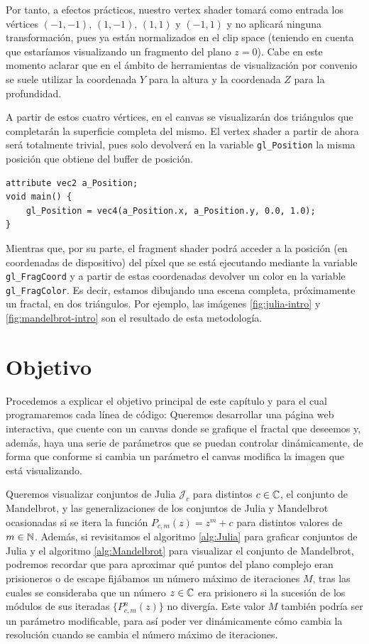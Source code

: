 Por tanto, a efectos prácticos, nuestro vertex shader tomará como entrada los vértices $(-1,-1)$, $(1,-1)$, $(1,1)$ y $(-1,1)$ y no aplicará ninguna transformación, pues ya están normalizados en el clip space (teniendo en cuenta que estaríamos visualizando un fragmento del plano $z=0$). Cabe en este momento aclarar que en el ámbito de herramientas de visualización por convenio se suele utilizar la coordenada $Y$ para la altura y la coordenada $Z$ para la profundidad. 

A partir de estos cuatro vértices, en el canvas se visualizarán dos triángulos que completarán la superficie completa del mismo. El vertex shader a partir de ahora será totalmente trivial, pues solo devolverá en la variable \verb|gl_Position| la misma posición que obtiene del buffer de posición.

\begin{lstlisting}
attribute vec2 a_Position;
void main() {
    gl_Position = vec4(a_Position.x, a_Position.y, 0.0, 1.0);
}
\end{lstlisting}

Mientras que, por su parte, el fragment shader podrá acceder a la posición (en coordenadas de dispositivo) del píxel que se está ejecutando mediante la variable \verb|gl_FragCoord| y a partir de estas coordenadas devolver un color en la variable \verb|gl_FragColor|. Es decir, estamos dibujando una escena completa, próximamente un fractal, en dos triángulos. Por ejemplo, las imágenes \ref{fig:julia-intro} y \ref{fig:mandelbrot-intro} son el resultado de esta metodología. 

\section{Objetivo}

Procedemos a explicar el objetivo principal de este capítulo y para el cual programaremos cada línea de código: Queremos desarrollar una página web interactiva, que cuente con un canvas donde se grafique el fractal que deseemos y, además, haya una serie de parámetros que se puedan controlar dinámicamente, de forma que conforme si cambia un parámetro el canvas modifica la imagen que está visualizando.

Queremos visualizar conjuntos de Julia $\mathcal{J}_c$ para distintos $c\in\mathbb{C}$, el conjunto de Mandelbrot, y las generalizaciones de los conjuntos de Julia y Mandelbrot ocasionadas si se itera la función $P_{c,m}(z)=z^m+c$ para distintos valores de $m\in\mathbb{N}$. Además, si revisitamos el algoritmo \ref{alg:Julia} para graficar conjuntos de Julia y el algoritmo \ref{alg:Mandelbrot} para visualizar el conjunto de Mandelbrot, podremos recordar que para aproximar qué puntos del plano complejo eran prisioneros o de escape fijábamos un número máximo de iteraciones $M$, tras las cuales se consideraba que un número $z\in\mathbb{C}$ era prisionero si la sucesión de los módulos de sus iteradas $\{P_{c,m}^n(z)\}$ no divergía. Este valor $M$ también podría ser un parámetro modificable, para así poder ver dinámicamente cómo cambia la resolución cuando se cambia el número máximo de iteraciones.

